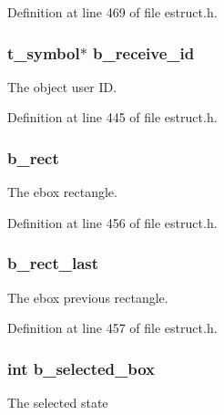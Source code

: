 Definition at line 469 of file estruct.\-h.

\hypertarget{struct__ebox_a3fb2b6968877ffd009753ccc0fe96769}{
\subsubsection[{b\-\_\-receive\-\_\-id}]{\setlength{\rightskip}{0pt plus 5cm}t\-\_\-symbol$\ast$ b\-\_\-receive\-\_\-id}}\label{struct__ebox_a3fb2b6968877ffd009753ccc0fe96769}
The object user I\-D. 

Definition at line 445 of file estruct.\-h.

\hypertarget{struct__ebox_abc70ff46c135ee9f377a038bbc05a33e}{
\subsubsection[{b\-\_\-rect}]{ b\-\_\-rect}}\label{struct__ebox_abc70ff46c135ee9f377a038bbc05a33e}
The ebox rectangle. 

Definition at line 456 of file estruct.\-h.

\hypertarget{struct__ebox_a2a0a15d3bc005cd4f815088b230b5ebd}{
\subsubsection[{b\-\_\-rect\-\_\-last}]{ b\-\_\-rect\-\_\-last}}\label{struct__ebox_a2a0a15d3bc005cd4f815088b230b5ebd}
The ebox previous rectangle. 

Definition at line 457 of file estruct.\-h.

\hypertarget{struct__ebox_acc1a127070b19ccf6e222d7349c84c96}{
\subsubsection[{b\-\_\-selected\-\_\-box}]{\setlength{\rightskip}{0pt plus 5cm}int b\-\_\-selected\-\_\-box}}\label{struct__ebox_acc1a127070b19ccf6e222d7349c84c96}
The selected state 


